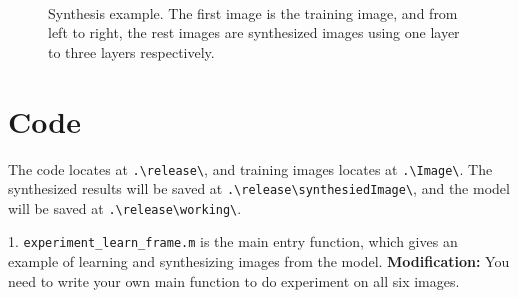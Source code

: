 \documentclass[11pt]{article}
\begin{document}
\begin{figure}[h]
	\centering
	\setlength{\fboxrule}{1pt}
	\setlength{\fboxsep}{0cm}	
	\\[3px]
	\caption{Synthesis example. The first image is the training image, and from left to right, the rest images are synthesized images using one layer to three layers respectively.}
	\label{fig:syn}
\end{figure}

\section{Code}
The code locates at  \verb|.\release\|, and training images locates at \verb|.\Image\|. The synthesized results will be saved at \verb|.\release\synthesiedImage\|, and the model will be saved at \verb|.\release\working\|.

1. \verb|experiment_learn_frame.m| is the main entry function, which gives an example of learning and synthesizing images from the model. \textbf{Modification:} You need to write your own main function to do experiment on all six images.
\end{document}
